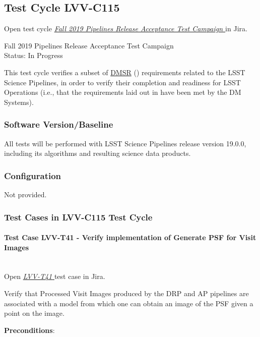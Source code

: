 \documentclass[DM,lsstdraft,STR,toc]{lsstdoc}
\begin{document}
\subsection{Test Cycle LVV-C115 }

Open test cycle {\it \href{https://jira.lsstcorp.org/secure/Tests.jspa#/testrun/LVV-C115}{ Fall 2019 Pipelines Release Acceptance Test Campaign
}} in Jira.

 Fall 2019 Pipelines Release Acceptance Test Campaign
\\
Status: In Progress

 This test cycle verifies a subset of
\href{https://lse-61.lsst.io/}{DMSR} () requirements related to
the LSST Science Pipelines, in order to verify their completion and
readiness for LSST Operations (i.e., that the requirements laid out in
 have been met by the DM Systems).


\subsubsection{Software Version/Baseline}
 All tests will be performed with LSST Science Pipelines release version
19.0.0, including its algorithms and resulting science data products.~


\subsubsection{Configuration}
Not provided.

\subsubsection{Test Cases in LVV-C115 Test Cycle}

\paragraph{Test Case LVV-T41 -  Verify implementation of Generate PSF for Visit Images
 }\mbox{}\\

Open  \href{https://jira.lsstcorp.org/secure/Tests.jspa#/testCase/LVV-T41}{\textit{ LVV-T41 } }
test case in Jira.

 Verify that Processed Visit Images produced by the DRP and AP pipelines
are associated with a model from which one can obtain an image of the
PSF given a point on the image.


\textbf{ Preconditions}:\\
\end{document}
